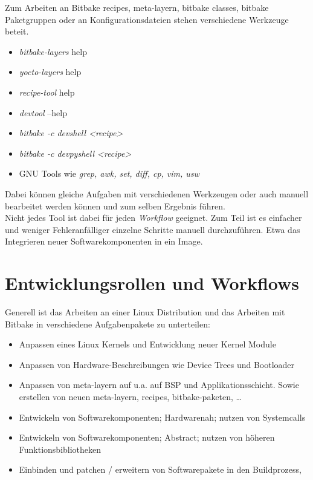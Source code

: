     Zum Arbeiten an Bitbake recipes, meta-layern, bitbake classes,
        bitbake Paketgruppen oder an Konfigurationsdateien stehen verschiedene
Werkzeuge beteit.
        \begin{itemize}
            \item \textit{bitbake-layers} help
            \item \textit{yocto-layers } help
            \item \textit{recipe-tool} help
            \item \textit{devtool } --help
            \item \textit{bitbake -c devshell <recipe>}
            \item \textit{bitbake -c devpyshell <recipe>}
            \item GNU Tools wie \textit{grep, awk, set, diff, cp, vim, usw}
        \end{itemize}
         Dabei können gleiche Aufgaben mit verschiedenen Werkzeugen oder auch
         manuell bearbeitet werden können und zum selben Ergebnis führen.\\

         Nicht jedes Tool ist dabei für jeden \textit{Workflow} geeignet. Zum
         Teil ist es einfacher und weniger Fehleranfälliger einzelne Schritte manuell
durchzuführen. Etwa das Integrieren neuer Software\-komponenten in ein Image.





\section{Entwicklungsrollen und Workflows}%
\label{sec:workflows}
Generell ist das Arbeiten an einer Linux Distribution und das Arbeiten mit
Bitbake in verschiedene Aufgabenpakete zu unterteilen:
\begin{itemize}
    \item Anpassen eines Linux Kernels und Entwicklung neuer Kernel Module
    \item Anpassen von Hardware-Beschreibungen wie Device Trees und Bootloader
    \item Anpassen von meta-layern auf u.a. auf BSP und Applikationsschicht.
        Sowie erstellen von neuen meta-layern, recipes, bitbake-paketen, \ldots
    \item Entwickeln von Softwarekomponenten; Hardwarenah; nutzen von
        Systemcalls
    \item Entwickeln von Softwarekomponenten; Abstract; nutzen von höheren
        Funktionsbibliotheken
    \item Einbinden und patchen / erweitern von Softwarepakete in den Buildprozess,
\end{itemize}

